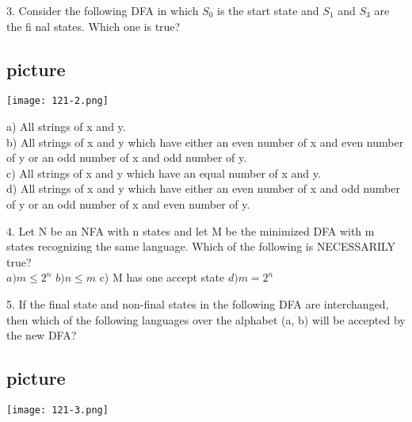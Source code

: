 \documentclass[9pt]{beamer}
\begin{document}
\begin{frame}

\vspace*{3mm}
\hspace{-0.5cm}
3. Consider the following DFA in which $S_0$ is the start state and $S_1$ and $S_3$ are the fi nal states. Which
one is true?\\
\vspace*{3mm}

\begin{center}
\section{picture}
\texttt{[image: 121-2.png]}
\end{center}

\vspace*{3mm}
\hspace{0.5cm}

a) All strings of x and y.\\
b) All strings of x and y which have either an even number of x and even number of y or an odd
number of x and odd number of y.\\
c) All strings of x and y which have an equal number of x and y.\\
d) All strings of x and y which have either an even number of x and odd number of y or an odd
number of x and even number of y.\\
\vspace*{3mm}

\vspace*{0.2cm}
\end{frame}

\begin{frame}
4. Let N be an NFA with n states and let M be the minimized DFA with m states recognizing the
same language. Which of the following is NECESSARILY true?\\

\vspace*{3mm}
\hspace{0.5cm}
$a) m \leq 2 ^{n}$  \hspace*{0.5cm}  $b) n \leq m$  \hspace*{0.5cm}   c) M has one accept state  \hspace*{0.5cm}  $d) m = 2 ^{n}$ \\
\vspace*{3mm}

\vspace*{0.2cm}
5. If the final state and non-final states in the following DFA are interchanged, then which of the
following languages over the alphabet (a, b) will be accepted by the new DFA?\\

\begin{center}
\section{picture}
\texttt{[image: 121-3.png]}
\end{center}
\end{frame}
\end{document}
